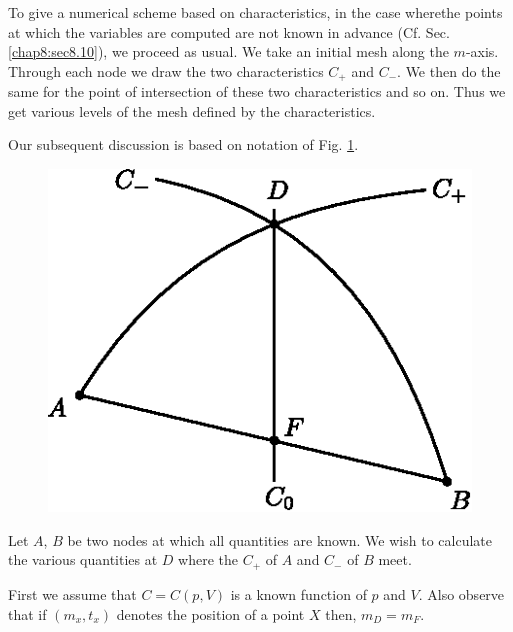To give a numerical scheme based on characteristics, in the case where\pageoriginale the points at which the variables are computed are not known in advance (Cf. Sec. \ref{chap8:sec8.10}), we proceed as usual. We take an initial mesh along the $m$-axis. Through each node we draw the two characteristics $C_+$ and $C_-$. We then do the same for the point of intersection of these two characteristics and so on. Thus we get various levels of the mesh defined by the characteristics. 

Our subsequent discussion is based on notation of Fig. \ref{c9:fig9.1}.

\begin{figure}[H]
\centering
\includegraphics{figures/fig52-9.1.eps}
\caption{}\label{c9:fig9.1}
\end{figure}

Let $A$, $B$ be two nodes at which all quantities are known. We wish to calculate the various quantities at $D$ where the $C_+$ of $A$ and $C_-$ of $B$ meet. 

First we assume that $C = C(p,V)$ is a known function of $p$ and $V$. Also observe that if $(m_x, t_x)$ denotes the position of a point $X$ then, $m_D = m_F$. 

